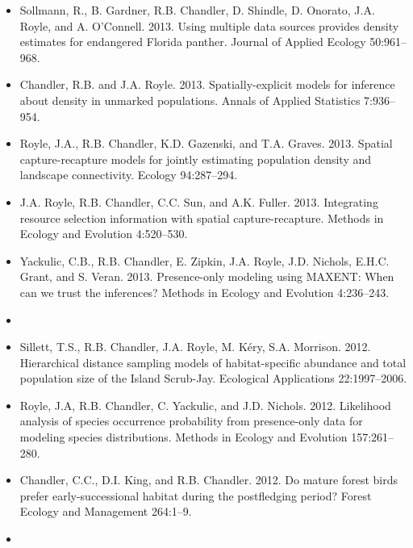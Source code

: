 \documentclass[12pt]{article}
\begin{document}
\begin{itemize}
\item Sollmann, R., B. Gardner, R.B. Chandler, D. Shindle,
  D. Onorato, J.A. Royle, and A. O'Connell. 2013.
  Using multiple data sources provides density estimates for
  endangered Florida panther. Journal of Applied Ecology 50:961--968.

\item Chandler, R.B. and J.A. Royle. 2013.
  Spatially-explicit models for inference about density in unmarked
  populations. Annals of Applied Statistics 7:936--954.

\item Royle, J.A., R.B. Chandler, K.D. Gazenski, and
  T.A. Graves. 2013. Spatial capture-recapture models for jointly
  estimating population density and landscape connectivity. Ecology
  94:287--294. 

\item J.A. Royle, R.B. Chandler, C.C. Sun, and
  A.K. Fuller. 2013. Integrating resource selection information with
  spatial capture-recapture. Methods in Ecology and Evolution 4:520--530.

\item Yackulic, C.B., R.B. Chandler, E. Zipkin, J.A. Royle,
  J.D. Nichols, E.H.C. Grant, and S. Veran. 2013. Presence-only
  modeling using MAXENT: When can we trust the inferences? Methods in
  Ecology and Evolution 4:236--243. 

\item[] { \\}

\item Sillett, T.S., R.B. Chandler, J.A. Royle, M. K\'{e}ry,
  S.A. Morrison. 2012. Hierarchical distance sampling models of
  habitat-specific abundance and total population size of the Island
  Scrub-Jay. Ecological Applications 22:1997--2006.

\item Royle, J.A, R.B. Chandler, C. Yackulic, and
  J.D. Nichols. 2012. Likelihood analysis of species occurrence
  probability from presence-only data for modeling species
  distributions. Methods in Ecology and Evolution 157:261--280.

\item Chandler, C.C., D.I. King, and R.B. Chandler. 2012. Do mature
  forest birds prefer early-successional habitat
  during the postfledging period? Forest Ecology and Management 264:1--9.

\item[] { \\}


\end{itemize}
\end{document}
